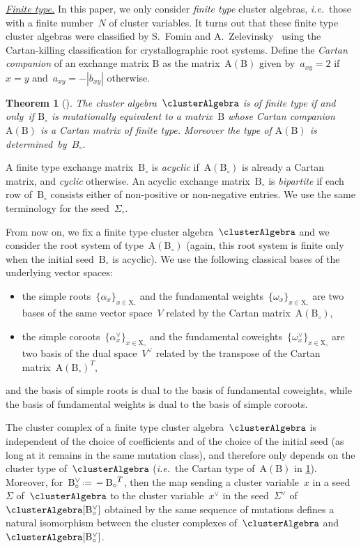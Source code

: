 \documentclass{amsart}
\newtheorem{theorem}{Theorem}[section]
\theoremstyle{definition}
\newcommand{\eqdef}{\mbox{\,\raisebox{0.2ex}{\scriptsize\ensuremath{\mathrm:}}\ensuremath{=}\,}} %
\newcommand{\transpose}[1]{{#1}^T} %
\newcommand{\ie}{\textit{i.e.}~} %
\newcommand{\darkblue}{\color{darkblue}} %
\newcommand{\defn}[1]{\textsl{\darkblue #1}} %
\newcommand{\para}[1]{\medskip\noindent\uline{\textit{#1.}}} %
\newcommand{\seed}{\Sigma} %
\newcommand{\cluster}{\mathrm{X}} %
\newcommand{\B}{\mathrm{B}} %
\newcommand{\A}[1]{\mathrm{A}({#1})} %
\newcommand{\simpleRoot}{\alpha} %
\newcommand{\fundamentalWeight}{\omega} %
\begin{document}
\para{Finite type}
%
In this paper, we only consider \defn{finite type} cluster algebras, \ie those with a finite number~$N$ of cluster variables.
It turns out that these finite type cluster algebras were classified by S.~Fomin and A.~Zelevinsky~\cite{FominZelevinsky-ClusterAlgebrasII} using the Cartan-killing classification for crystallographic root systems.
Define the \defn{Cartan companion} of an exchange matrix $\B$ as the matrix~$\A{\B}$ given by~$a_{xy} = 2$ if~$x = y$ and~$a_{xy} = -|b_{xy}|$ otherwise.

\begin{theorem}[{\cite[Theorem~1.4]{FominZelevinsky-ClusterAlgebrasII}}]
\label{thm:finiteTypeClassification}
The cluster algebra~$\clusterAlgebra$ is of finite type if and only~if $\B_\circ$ is mutationally equivalent to a matrix~$\B$ whose Cartan companion~$\A{\B}$ is a Cartan matrix of finite type. Moreover the type of $\A{\B}$ is determined~by~$B_\circ$.
\end{theorem}

A finite type exchange matrix~$\B_\circ$ is \defn{acyclic} if~$\A{\B_\circ}$ is already a Cartan matrix, and \defn{cyclic} otherwise.
An acyclic exchange matrix~$\B_\circ$ is \defn{bipartite} if each row of~$\B_\circ$ consists either of non-positive or non-negative entries.
We use the same terminology for the seed~$\seed_\circ$.

From now on, we fix a finite type cluster algebra~$\clusterAlgebra$ and we consider the root system of type~$\A{\B_\circ}$ (again, this root system is finite only when the initial seed~$\B_\circ$ is acyclic). We use the following classical bases of the underlying vector spaces:
\begin{itemize}
\item the simple roots~$\{\simpleRoot_x\}_{x \in \cluster_\circ}$ and the fundamental weights~$\{\fundamentalWeight_x\}_{x \in \cluster_\circ}$ are two bases of the same vector space~$V$ related by the Cartan matrix~$\A{\B_\circ}$,
\item the simple coroots~$\{\simpleRoot^\vee_x\}_{x \in \cluster_\circ}$ and the fundamental coweights~$\{\fundamentalWeight^\vee_x\}_{x \in \cluster_\circ}$ are two basis of the dual space~$V^\vee$ related by the transpose of the Cartan matrix~$\transpose{\A{\B_\circ}}$,
\end{itemize}
and the basis of simple roots is dual to the basis of fundamental coweights, while the basis of fundamental weights is dual to the basis of simple coroots.

The cluster complex of a finite type cluster algebra~$\clusterAlgebra$ is independent of the choice of coefficients and of the choice of the initial seed (as long at it remains in the same mutation class), and therefore only depends on the cluster type of~$\clusterAlgebra$ (\ie the Cartan type of~$\A{\B}$ in \cref{thm:finiteTypeClassification}).
Moreover, for~$\B_\circ^\vee \eqdef -\transpose{\B_\circ}$, then the map sending a cluster variable~$x$ in a seed~$\seed$ of~$\clusterAlgebra$ to the cluster variable~$x^\vee$ in the seed~$\seed^\vee$ of~$\clusterAlgebra[\B_\circ^\vee]$ obtained by the same sequence of mutations defines a natural isomorphism between the cluster complexes of~$\clusterAlgebra$ and~$\clusterAlgebra[\B_\circ^\vee]$.
\end{document}
